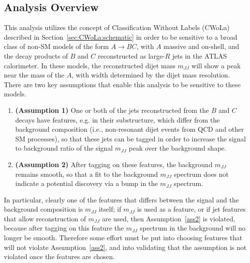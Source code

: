 \subsection{Analysis Overview}
\label{sec:CWoLa:Analysis:Overview}
This analysis utilizes the concept of Classification Without Labels (CWoLa) described in Section~\ref{sec:CWoLa:schematic} in order to be sensitive to a broad class of non-SM models of the form $A\rightarrow BC$, with $A$ massive and on-shell, and the decay products of $B$ and $C$ reconstructed as large-$R$ jets in the ATLAS calorimeter.
In these models, the reconstructed dijet mass $m_{JJ}$ will show a peak near the mass of the $A$, with width determined by the dijet mass resolution.
There are two key assumptions that enable this analysis to be sensitive to these models.
\begin{enumerate}
  \item \textbf{(Assumption 1)} One or both of the jets reconstructed from the $B$ and $C$ decays have features, e.g. in their substructure, which differ from the background composition (i.e., non-resonant dijet events from QCD and other SM processes), so that these jets can be tagged in order to increase the signal to background ratio of the signal $m_{JJ}$ peak over the background shape. \label{ass1}
  \item \textbf{(Assumption 2)} After tagging on these features, the background $m_{JJ}$ remains smooth, so that a fit to the background $m_{JJ}$ spectrum does not indicate a potential discovery via a bump in the $m_{JJ}$ spectrum. \label{ass2}
\end{enumerate}
In particular, clearly one of the features that differs between the signal and the background composition is $m_{JJ}$ itself; if $m_{JJ}$ is used as a feature, or if jet features that allow reconstruction of $m_{JJ}$ are used, then Assumption~\ref{ass2} is violated, because after tagging on this feature the $m_{JJ}$ spectrum in the background will no longer be smooth.
Therefore some effort must be put into choosing features that will not violate Assumption~\ref{ass2}, and into validating that the assumption is not violated once the features are chosen.

